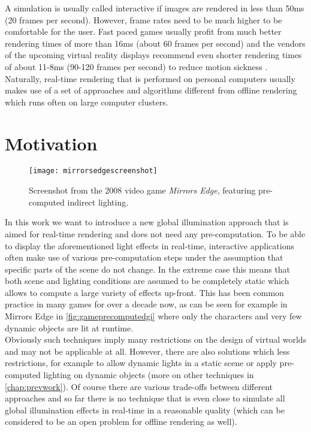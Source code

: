 \documentclass[thesis.tex]{subfiles}
\begin{document}
A simulation is usually called interactive if images are rendered in less than 50ms (20 frames per second).
However, frame rates need to be much higher to be comfortable for the user.
Fast paced games usually profit from much better rendering times of more than 16ms (about 60 frames per second) \cite{bib:shooterfps} and the vendors of the upcoming virtual reality displays recommend even shorter rendering times of about 11-8ms (90-120 frames per second) to reduce motion sickness \cite{bib:oculushighfps}.
Naturally, real-time rendering that is performed on personal computers usually makes use of a set of approaches and algorithms different from offline rendering which runs often on large computer clusters.

\section{Motivation}
\begin{figure}[h]
\centering
\texttt{[image: mirrorsedgescreenshot]}
\caption{Screenshot from the 2008 video game \emph{Mirrors Edge}, featuring pre-computed indirect lighting.}
\label{fig:gameprecomputedgi}
\end{figure}
In this work we want to introduce a new global illumination approach that is aimed for real-time rendering and does not need any pre-computation.
To be able to display the aforementioned light effects in real-time, interactive applications often make use of various pre-computation steps under the assumption that specific parts of the scene do not change.
In the extreme case this means that both scene and lighting conditions are assumed to be completely static which allows to compute a large variety of effects up-front.
This has been common practice in many games for over a decade now, as can be seen for example in Mirrors Edge in \autoref{fig:gameprecomputedgi} where only the characters and very few dynamic objects are lit at runtime.
\\
Obviously such techniques imply many restrictions on the design of virtual worlds and may not be applicable at all.
However, there are also solutions which less restrictions, for example to allow dynamic lights in a static scene or apply pre-computed lighting on dynamic objects (more on other techniques in \autoref{chap:prevwork}).
Of course there are various trade-offs between different approaches and so far there is no technique that is even close to simulate all global illumination effects in real-time in a reasonable quality (which can be considered to be an open problem for offline rendering as well).
\end{document}
